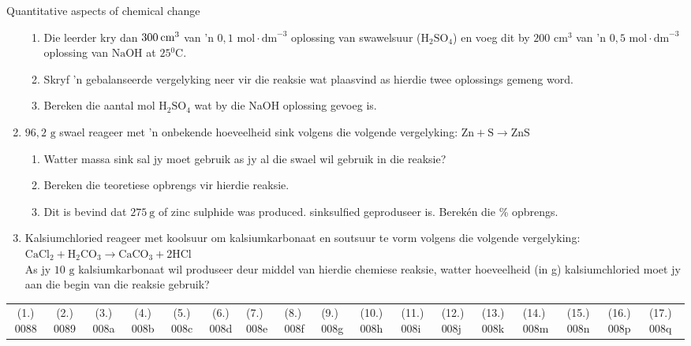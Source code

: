 \begin{eocexercises}{Quantitative aspects of chemical change}
\begin{enumerate}[noitemsep, label=\textbf{\arabic*}. ]
\begin{enumerate}[noitemsep, label=\textbf{\alph*}. ]
 \item Die leerder kry dan $300\phantom{\rule{2pt}{0ex}}{\text{cm}}^{3}$ van 'n $0,1 \text{ mol} \cdot {\text{dm}}^{-3}$ oplossing van swawelsuur ($\text{H}{}_{2}\text{SO}{}_{4}$) en voeg dit by $200 {\text{ cm}}^{3}$ van 'n $0,5 \text{ mol} \cdot {\text{dm}}^{-3}$ oplossing van $\text{NaOH}$ at $25{}^{0}\text{C}$.
 \item Skryf 'n gebalanseerde vergelyking neer vir die reaksie wat plaasvind as hierdie twee oplossings gemeng word.
 \item Bereken die aantal mol $\text{H}{}_{2}\text{SO}{}_{4}$ wat by die NaOH oplossing gevoeg is.
\end{enumerate}
\item $96,2 \text{ g}$ swael reageer met 'n onbekende hoeveelheid sink volgens die volgende vergelyking: 
$\text{Zn}+\text{S}\to \text{ZnS}$
 \begin{enumerate}[noitemsep, label=\textbf{\alph*}. ] 
 \item Watter massa sink sal jy moet gebruik as jy al die swael wil gebruik in die reaksie?
 \item Bereken die teoretiese opbrengs vir hierdie reaksie.
 \item Dit is bevind dat $275~\text{g}$ of zinc sulphide was produced. sinksulfied geproduseer is. Berekén die \% opbrengs.
 \end{enumerate}
\item Kalsiumchloried reageer met koolsuur om kalsiumkarbonaat en soutsuur te vorm volgens die volgende vergelyking:\\
${\text{CaCl}}_{2}+{\text{H}}_{2}{\text{CO}}_{3}\to {\text{CaCO}}_{3}+2\text{HCl}$\\
As jy $10 \text{ g}$ kalsiumkarbonaat wil produseer deur middel van hierdie chemiese reaksie, watter hoeveelheid (in g) kalsiumchloried moet jy aan die begin van die reaksie gebruik?
                \end{enumerate}
\practiceinfo
\par 
 \par \begin{tabular}[h]{cccccc}
 (1.) 0088  &  (2.) 0089  &  (3.) 008a  &  (4.) 008b  &  (5.) 008c  &  (6.) 008d  &  (7.) 008e  &  (8.) 008f  &  (9.) 008g  &  (10.) 008h  &  (11.) 008i  &  (12.) 008j  &  (13.) 008k  &  (14.) 008m  &  (15.) 008n  & (16.) 008p & (17.) 008q \end{tabular}
\end{eocexercises}

